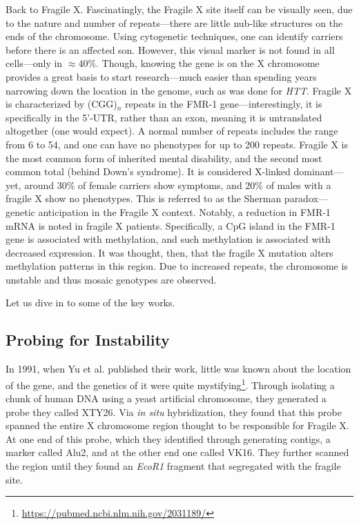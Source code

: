 Back to Fragile X. Fascinatingly, the Fragile X site itself can be visually seen, due to the nature and number of repeats---there are little nub-like structures on the ends of the chromosome. Using cytogenetic techniques, one can identify carriers before there is an affected son. However, this visual marker is not found in all cells---only in $\approx 40\%$. Though, knowing the gene is on the X chromosome provides a great basis to start research---much easier than spending years narrowing down the location in the genome, such as was done for \textit{HTT}. Fragile X is characterized by (CGG)$_n$ repeats in the FMR-1 gene---interestingly, it is specifically in the 5'-UTR, rather than an exon, meaning it is untranslated altogether (one would expect). A normal number of repeats includes the range from 6 to 54, and one can have no phenotypes for up to 200 repeats. Fragile X is the most common form of inherited mental disability, and the second most common total (behind Down's syndrome). It is considered X-linked dominant---yet, around 30\% of female carriers show symptoms, and 20\% of males with a fragile X show no phenotypes. This is referred to as the Sherman paradox---genetic anticipation in the Fragile X context. Notably, a reduction in FMR-1 mRNA is noted in fragile X patients. Specifically, a CpG island in the FMR-1 gene is associated with methylation, and such methylation is associated with decreased expression. It was thought, then, that the fragile X mutation alters methylation patterns in this region. Due to increased repeats, the chromosome is unstable and thus mosaic genotypes are observed.\newline

Let us dive in to some of the key works.  


\subsection*{Probing for Instability}

In 1991, when Yu et al. published their work, little was known about the location of the gene, and the genetics of it were quite mystifying\footnote{\url{https://pubmed.ncbi.nlm.nih.gov/2031189/}}. Through isolating a chunk of human DNA using a yeast artificial chromosome, they generated a probe they called XTY26. Via \textit{in situ} hybridization, they found that this probe spanned the entire X chromosome region thought to be responsible for Fragile X. At one end of this probe, which they identified through generating contigs, a marker called Alu2, and at the other end one called VK16. They further scanned the region until they found an \textit{EcoR1} fragment that segregated with the fragile site.\newline

